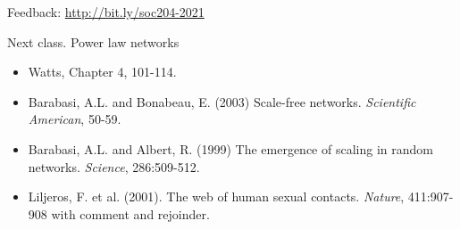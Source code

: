 \documentclass[aspectratio=169]{beamer}
\begin{document}
\begin{frame}

Feedback: \Large{\url{http://bit.ly/soc204-2021}}

\pause
Next class.  Power law networks
\begin{itemize}
\item Watts, Chapter 4, 101-114.
\item Barabasi, A.L. and Bonabeau, E. (2003) Scale-free networks. \textit{Scientific American}, 50-59. 
\item Barabasi, A.L. and Albert, R. (1999) The emergence of scaling in random networks. \textit{Science}, 286:509-512.
\item Liljeros, F. et al. (2001). The web of human sexual contacts. \textit{Nature}, 411:907-908 with comment and rejoinder.
\end{itemize}


\end{frame}
\end{document}
